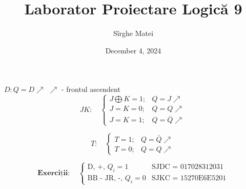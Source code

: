 \documentclass[12pt]{article}
\title{\bfseries Laborator Proiectare Logică 9}
\author{Sîrghe Matei}
\date{December 4, 2024}
\begin{document}
\maketitle

\renewcommand{\arraystretch}{1}

$D:Q=D\nearrow$\hspace{1cm} $\nearrow$ - frontul ascendent\\
\[
JK:\quad
\begin{cases}
J \bigoplus K = 1; & Q = J \nearrow \\
J = K = 0; & Q = Q \nearrow \\
J = K = 1; & Q = \bar{Q} \nearrow
\end{cases}
\]

\[
T:\quad
\begin{cases}
T = 1; & Q = \bar{Q} \nearrow \\
T = 0; & Q = Q \nearrow 
\end{cases}
\]

\[
\textbf{Exerciții}:\quad
\begin{cases}
\text{D, +, } Q_i = 1 & \text{SJDC = 017028312031} \\ 
\text{BB - JR, -, } Q_i = 0 & \text{SJKC = 15270E6E5201}
\end{cases}
\]
\end{document}
